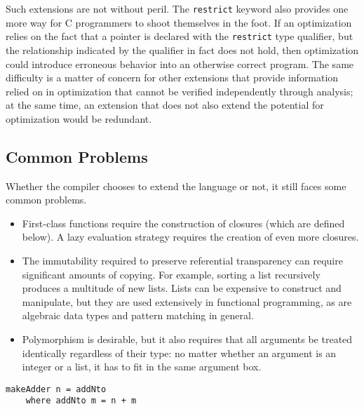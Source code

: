 Such extensions are not without peril. The \lstinline[morekeywords=restrict]{restrict} keyword also provides one more way for C programmers to shoot themselves in the foot. If an optimization relies on the fact that a pointer is declared with the \lstinline[morekeywords=restrict]{restrict} type qualifier, but the relationship indicated by the qualifier in fact does not hold, then optimization could introduce erroneous behavior into an otherwise correct program. The same difficulty is a matter of concern for other extensions that provide information relied on in optimization that cannot be verified independently through analysis; at the same time, an extension that does not also extend the potential for optimization would be redundant.

\subsection{Common Problems}
Whether the compiler chooses to extend the language or not, it still faces some common problems.
\begin{itemize}
\item
First-class functions require the construction of closures (which are defined below). A lazy evaluation strategy requires the creation of even more closures.

\item 
The immutability required to preserve referential transparency can require significant amounts of copying. For example, sorting a list recursively produces a multitude of new lists. Lists can be expensive to construct and manipulate, but they are used extensively in functional programming, as are algebraic data types and pattern matching in general.

\item
Polymorphism is desirable, but it also requires that all arguments be treated identically regardless of their type: no matter whether an argument is an integer or a list, it has to fit in the same argument box.
\end{itemize}

\begin{lstlisting}[float,caption={[Creating a closure]Creating a closure\\
A closure is a function together with an environment providing bindings for the function's free variables. The binding used for each variable is the one lexically closest to where the function is defined. In this example, the variable \code{n} is free in the definition of \code{addNto}. The closest definition of \code{n} is that made by \code{makeAdder}. Thus, evaluating \code{makeAdder 3} results in a closure containing the function \code{addNto} and an environment in which \code{n} is bound to \code{3}.},label={closure}]
makeAdder n = addNto
    where addNto m = n + m
\end{lstlisting}

